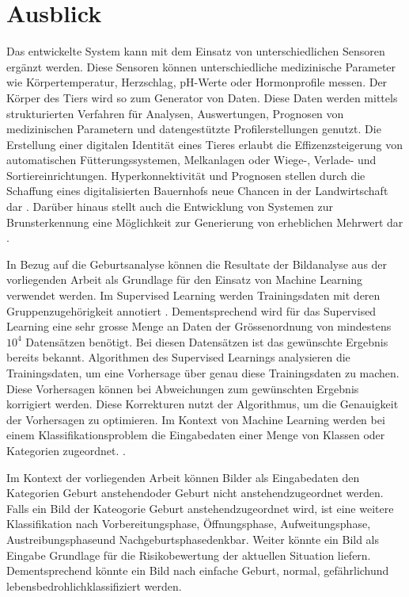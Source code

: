 

\chapter{Ausblick}
Das entwickelte System kann mit dem Einsatz von unterschiedlichen Sensoren ergänzt werden. Diese Sensoren können unterschiedliche medizinische Parameter wie Körpertemperatur, Herzschlag,  pH-Werte oder Hormonprofile messen. Der Körper des Tiers wird so zum Generator von Daten. Diese Daten werden mittels strukturierten Verfahren für Analysen, Auswertungen, Prognosen von medizinischen Parametern und datengestützte Profilerstellungen genutzt. Die Erstellung einer digitalen Identität eines Tieres erlaubt die Effizenzsteigerung von automatischen Fütterungssystemen, Melkanlagen oder Wiege-, Verlade- und Sortiereinrichtungen. Hyperkonnektivität und Prognosen stellen durch die Schaffung eines digitalisierten Bauernhofs neue Chancen in der Landwirtschaft dar \citep[S. 308 ff.]{Kasprowicz2019}. Darüber hinaus stellt auch die Entwicklung von Systemen zur \gls{Brunst}erkennung eine Möglichkeit zur Generierung von erheblichen Mehrwert dar \citep{Hirsbrunner2020}.


In Bezug auf die Geburtsanalyse können die Resultate der Bildanalyse aus der vorliegenden Arbeit als Grundlage für den Einsatz von Machine Learning verwendet werden.
Im Supervised Learning werden Trainingsdaten mit deren Gruppenzugehörigkeit annotiert \citep[S. 253]{Firouzi2020}. 
Dementsprechend wird für das Supervised Learning eine sehr grosse Menge an Daten der Grössenordnung von mindestens ${10^4}$ Datensätzen benötigt. Bei diesen Datensätzen ist das gewünschte Ergebnis bereits bekannt. Algorithmen des Supervised Learnings analysieren die Trainingsdaten, um eine Vorhersage über genau diese Trainingsdaten zu machen. Diese Vorhersagen können bei Abweichungen zum gewünschten Ergebnis korrigiert werden. Diese Korrekturen nutzt der Algorithmus, um die Genauigkeit der Vorhersagen zu optimieren. Im Kontext von Machine Learning werden bei einem Klassifikationsproblem die Eingabedaten einer Menge von Klassen oder Kategorien zugeordnet. \citep[S. 440]{FernandezVillan2019}.

Im Kontext der vorliegenden Arbeit können Bilder als Eingabedaten den Kategorien \flqq Geburt anstehend\frqq oder \flqq Geburt nicht anstehend\frqq zugeordnet werden. Falls ein Bild der Kateogorie \flqq Geburt anstehend\frqq zugeordnet wird, ist eine weitere Klassifikation nach \flqq Vorbereitungsphase\frqq, \flqq Öffnungsphase\frqq, \flqq Aufweitungsphase\frqq, \flqq Austreibungsphase\frqq und \flqq Nachgeburtsphase\frqq denkbar. Weiter könnte ein Bild als Eingabe Grundlage für die Risikobewertung der aktuellen Situation liefern. Dementsprechend könnte ein Bild nach \flqq einfache Geburt\frqq, \flqq normal\frqq, \flqq gefährlich\frqq und \flqq lebensbedrohlich\frqq klassifiziert werden. 

